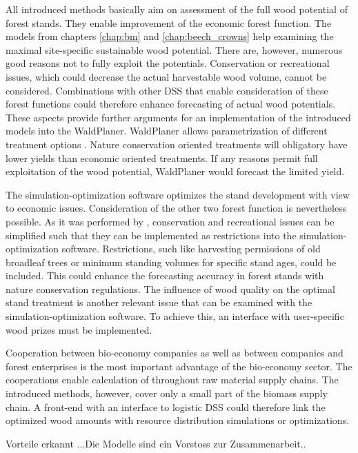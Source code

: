 All introduced methods basically aim on assessment of the full wood potential of forest stands. They enable improvement of the economic forest function. The models from chapters \ref{chap:bm} and \ref{chap:beech_crowns} help examining the maximal site-specific sustainable wood potential. There are, however, numerous good reasons not to fully exploit the potentials. Conservation or recreational issues, which could decrease the actual harvestable wood volume, cannot be considered. Combinations with other DSS that enable consideration of these forest functions could therefore enhance forecasting of actual wood potentials. These aspects provide further arguments for an implementation of the introduced models into the WaldPlaner. WaldPlaner allows parametrization of different treatment options \citep[p. 90-93]{hansen_2014}. Nature conservation oriented treatments will obligatory have lower yields than economic oriented treatments. If any reasons permit full exploitation of the wood potential, WaldPlaner would forecast the limited yield.

The simulation-optimization software optimizes the stand development with view to economic issues. Consideration of the other two forest function is nevertheless possible. As it was performed by \citet{yousefpour_2009}, conservation and recreational issues can be simplified such that they can be implemented as restrictions into the simulation-optimization software. Restrictions, such like harvesting permissions of old broadleaf trees or minimum standing volumes for specific stand ages, could be included. This could enhance the forecasting accuracy in forest stands with nature conservation regulations. The influence of wood quality on the optimal stand treatment is another relevant issue that can be examined with the simulation-optimization software. To achieve this, an interface with user-specific wood prizes must be implemented.

Cooperation between bio-economy companies as well as between companies and forest enterprises is the most important advantage of the bio-economy sector. The cooperations enable calculation of throughout raw material supply chains. The introduced methods, however, cover only a small part of the biomass supply chain. A front-end with an interface to logistic DSS could therefore link the optimized wood amounts with resource distribution simulations or optimizations.

Vorteile erkannt ...Die Modelle sind ein Vorstoss zur Zusammenarbeit.. 
